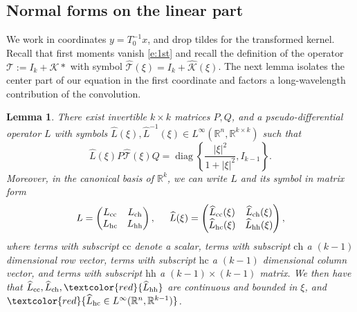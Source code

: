\documentclass[10pt]{article}
\newtheorem{Lemma}{Lemma}[section]
\newcommand{\R}{\mathbb{R}}
\newcommand{\K}{\mathcal{K}}
\newcommand{\That}{\widehat{\mathcal{T}}}
\newcommand{\diag}{\operatorname{diag}}
\begin{document}
\subsection{Normal forms on the linear part}\label{s:2.1}
We work in coordinates $y=T_0^{-1}x$, and drop tildes for the transformed kernel. Recall that first moments vanish \eqref{e:1st} and recall the definition of the operator $\mathcal{T}:=I_k+\K*$ with symbol $\That (\xi) = I_k + \widehat{{\K}} (\xi)$.  The next lemma isolates the center part of our equation in the first coordinate and factors a long-wavelength contribution of the convolution. 


\begin{Lemma}\label{Lem1} There exist invertible $k \times k$ matrices $P, Q$, and a pseudo-differential operator $L$ with symbols $\widehat{L}(\xi),\widehat{L}^{-1}(\xi) \in L^\infty(\R^n, \R^{k\times k}) $ such that 
\[
\widehat{L}(\xi)P\That(\xi)Q = \diag\left\{\dfrac{|\xi|^2}{1+|\xi|^2},I_{k-1} \right\}.
\]
Moreover, in the canonical basis of $\R^k$, we can write $L$ and its symbol in matrix form
\[
L  = \begin{pmatrix}
L_\mathrm{cc} & L_\mathrm{ch} \\
L_\mathrm{hc} & L_\mathrm{hh} 
\end{pmatrix}, \hspace{0.2in}
\widehat{L}(\xi)  = \begin{pmatrix}
\widehat{L}_\mathrm{cc}(\xi) & \widehat{L}_\mathrm{ch}(\xi) \\
\widehat{L}_\mathrm{hc}(\xi) & \widehat{L}_\mathrm{hh}(\xi) 
\end{pmatrix},
\]
where terms with subscript $\mathrm{cc}$ denote a scalar, terms with subscript $\mathrm{ch}$ a $(k-1)$ dimensional row vector, terms with subscript $\mathrm{hc}$ a $(k-1)$ dimensional column vector, and terms with subscript $\mathrm{hh}$ a $(k-1)\times (k-1)$ matrix. We then have that $\widehat{L}_\mathrm{cc},\widehat{L}_\mathrm{ch},\textcolor{red}{\widehat{L}_\mathrm{hh}}$ are continuous and bounded in $\xi$, and $\textcolor{red}{\widehat{L}_\mathrm{hc} \in L^\infty(\R^n, \R^{k-1})}$.
\end{Lemma}
\end{document}
